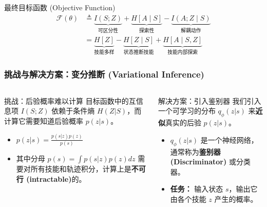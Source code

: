 \documentclass{beamer}
\begin{document}
\begin{frame}
    \begin{alertblock}{最终目标函数 (Objective Function)}
    \begin{align*}
        \mathcal{F}(\theta) 
        &\triangleq \underbrace{I(S; Z)}_{\text{可区分性}} 
                 + \underbrace{H[A \mid S]}_{\text{探索性}} 
                 - \underbrace{I(A; Z \mid S)}_{\text{解耦动作}} \\
        &= \underbrace{H[Z]}_{\text{技能多样}} 
           - \underbrace{H[Z \mid S]}_{\text{状态推断技能}} 
           + \underbrace{H[A \mid S, Z]}_{\text{技能内部探索}}
    \end{align*}
    \end{alertblock}

\end{frame}

\begin{frame}
    
    \frametitle{挑战与解决方案：变分推断 (Variational Inference)}
    \tiny
    \vspace{-0.2cm}
    \begin{columns}[T]
        \begin{column}{0.5\textwidth}
            \begin{alertblock}{挑战：后验概率难以计算}
                目标函数中的互信息项 $I(S;Z)$ 依赖于条件熵 $H(Z|S)$，而计算它需要知道后验概率 $p(z|s)$。
                \vspace{0.3em}
                \begin{itemize}
                    \item $p(z|s) = \frac{p(s|z)p(z)}{p(s)}$
                    \item 其中分母 $p(s) = \int p(s|z)p(z)dz$ 需要对所有技能和轨迹积分，计算上是\textbf{不可行 (intractable)}的。
                \end{itemize}
            \end{alertblock}
        \end{column}

        \begin{column}{0.5\textwidth}
            \begin{block}{解决方案：引入鉴别器}
                我们引入一个可学习的分布 $q_\phi(z|s)$ 来\textbf{近似}真实的后验 $p(z|s)$。
                \vspace{0.3em}
                \begin{itemize}
                    \item $q_\phi(z|s)$ 是一个神经网络，通常称为\textbf{鉴别器 (Discriminator)} 或分类器。
                    \item \textbf{任务：} 输入状态 $s$，输出它由各个技能 $z$ 产生的概率。
                \end{itemize}
            \end{block}
        \end{column}
    \end{columns}
    

\end{frame}
\end{document}

